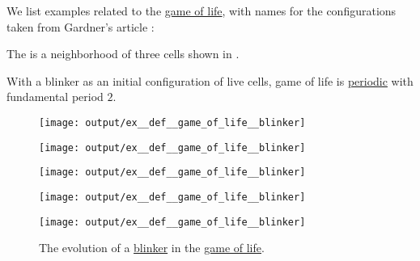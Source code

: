 \begin{example}\label{ex:def:game_of_life}
  We list examples related to the \hyperref[def:game_of_life]{game of life}, with names for the configurations taken from Gardner's article \cite[120]{Gardner1970GameOfLife}:
  \begin{thmenum}
     The  is a neighborhood of three cells shown in .

    With a blinker as an initial configuration of live cells, game of life is \hyperref[def:dynamical_system_periodicity]{periodic} with fundamental period \( 2 \).

    \begin{figure}[!ht]
      \begin{subcaptionblock}{0.15\textwidth}
        \centering
        \texttt{[image: output/ex\_\_def\_\_game\_of\_life\_\_blinker]}
        \caption{\( t = 0 \)}\label{fig:ex:def:game_of_life/blinker/0}
      \end{subcaptionblock}
      \hfill
      \begin{subcaptionblock}{0.15\textwidth}
        \centering
        \texttt{[image: output/ex\_\_def\_\_game\_of\_life\_\_blinker]}
        \caption{\( t = 1 \)}\label{fig:ex:def:game_of_life/blinker/1}
      \end{subcaptionblock}
      \hfill
      \begin{subcaptionblock}{0.15\textwidth}
        \centering
        \texttt{[image: output/ex\_\_def\_\_game\_of\_life\_\_blinker]}
        \caption{\( t = 2 \)}\label{fig:ex:def:game_of_life/blinker/2}
      \end{subcaptionblock}
      \hfill
      \begin{subcaptionblock}{0.15\textwidth}
        \centering
        \texttt{[image: output/ex\_\_def\_\_game\_of\_life\_\_blinker]}
        \caption{\( t = 3 \)}\label{fig:ex:def:game_of_life/blinker/3}
      \end{subcaptionblock}
      \hfill
      \begin{subcaptionblock}{0.15\textwidth}
        \centering
        \texttt{[image: output/ex\_\_def\_\_game\_of\_life\_\_blinker]}
        \caption{\( t = 4 \)}\label{fig:ex:def:game_of_life/blinker/4}
      \end{subcaptionblock}
      \caption{The evolution of a \hyperref[ex:def:game_of_life/blinker]{blinker} in the \hyperref[def:game_of_life]{game of life}.}\label{fig:ex:def:game_of_life/blinker}
    \end{figure}


\end{thmenum}
\end{example}

